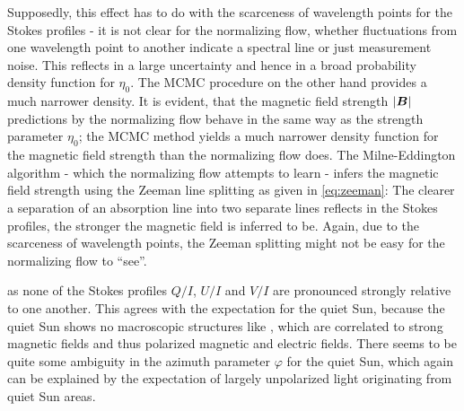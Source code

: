 \documentclass[a4paper,11pt]{report}
\def\fc#1{{\color{black}{#1}}} %
\def\lk#1{{\color{black}{#1}}}
\begin{document}
\fc{Recall, that the parameter densities for the line strength parameter $\eta_0$ are very broad; the line strength parameter is a measure for how pronounced an absorption line is relative to the continuum.} Supposedly, this effect has to do with the scarceness of wavelength points for the Stokes profiles - it is not clear for the normalizing flow, whether fluctuations from one wavelength point to another indicate a spectral line or just measurement noise. This reflects in a large uncertainty and hence in a broad probability density function for $\eta_0$. The MCMC procedure on the other hand provides a much narrower density. It is evident, that the magnetic field strength $|\bm{B}|$ predictions by the normalizing flow behave in the same way as the \fc{line} strength parameter $\eta_0$; the MCMC method yields a much narrower density function for the magnetic field strength than the normalizing flow does. The Milne-Eddington algorithm - which the normalizing flow attempts to learn - infers the magnetic field strength using the Zeeman line splitting as given in \cref{eq:zeeman}: The clearer a separation of an absorption line into two separate lines reflects in the Stokes profiles, the stronger the magnetic field is inferred to be. Again, due to the scarceness of wavelength points, the Zeeman splitting might not be easy for the normalizing flow to ``see''. \fc{Hence, larger uncertainties of the magnetic field strength inferences on behalf of the normalizing flow as compared to the MCMC method may be expected. A possible explanation for this might be that the MCMC method makes explicit use of the Milne-Eddington algorithm, while the normalizing flow is basically a ``coarse'' copy of the Milne-Eddington model working principle, whereby this copy is expected to be coarser, the less wavelength points are used in the wavelength window of observations.}

\fc{The Stokes parameters for the quiet Sun pixel (observation 1) show no strong polarization,} as none of the Stokes profiles $Q/I$, $U/I$ and $V/I$ are pronounced strongly relative to one another. This agrees with the expectation for the quiet Sun, because the quiet Sun shows no macroscopic structures like \lk{sunspots}, which are correlated to strong magnetic fields and thus polarized magnetic and electric fields. There seems to be quite some ambiguity in the azimuth parameter $\varphi$ for the quiet Sun, which again can be explained by the expectation of largely unpolarized light originating from quiet Sun areas.
\end{document}
